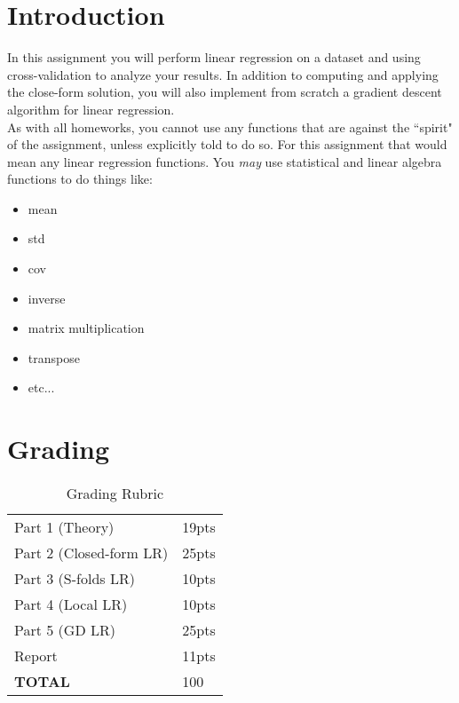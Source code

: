 \documentclass[12pt]{article}
\begin{document}
\maketitle


\section*{Introduction}
In this assignment you will perform linear regression on a dataset and using cross-validation to analyze your results.  In addition to computing and applying the close-form solution, you will also implement from scratch a gradient descent algorithm for linear regression.\\

\noindent
As with all homeworks, you cannot use any functions that are against the ``spirit" of the assignment, unless explicitly told to do so.  For this assignment that would mean any linear regression functions.   You \emph{may} use statistical and linear algebra functions to do things like:
\begin{itemize}
\item mean
\item std
\item cov
\item inverse
\item matrix multiplication
\item transpose
\item etc...
\end{itemize}


\section*{Grading}
\begin{table}[h]
\begin{center}
\begin{tabular}{|l|l|}
\hline
Part 1 (Theory) & 19pts\\
Part 2 (Closed-form LR) & 25pts\\
Part 3 (S-folds LR) & 10pts\\
Part 4 (Local LR) & 10pts\\
Part 5 (GD LR) & 25pts\\
Report & 11pts\\
\hline
\textbf{TOTAL} & 100 \\
\hline
\end{tabular}
\caption{Grading Rubric}
\end{center}
\end{table}
\end{document}
